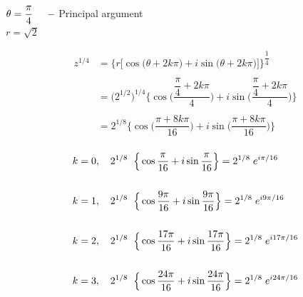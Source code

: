 \documentclass[11pt,a4paper]{article}
\begin{document}
$\theta  = \dfrac{\pi}{4} \hspace{0.5cm}- $ Principal argument\\

$r = \sqrt{2}$



\begin{align*}
z^{1/4} & = \Bigg\{r \big[ \cos \big(\theta + 2k\pi\big) + i \sin\big(\theta + 2k\pi\big)\big]\Bigg\}^{\dfrac{1}{4}}\\\\
& = \Big(2^{1/2}\Big)^{1/4}\Bigg\{ \cos \Big(\dfrac{\dfrac{\pi}{4} + 2k\pi}{4}\Big) + i \sin \Big(\dfrac{\dfrac{\pi}{4} + 2k\pi}{4}\Big)\Bigg\}\\\\ 
& = 2^{1/8}\Bigg\{ \cos \Big(\dfrac{\pi + 8k\pi}{16}\Big) + i \sin \Big(\dfrac{\pi + 8k\pi}{16}\Big)\Bigg\}\\
\end{align*}





\begin{align*}
k = 0,&  \hspace{0.4cm} 2^{1/8}\hspace{0.2cm}\Big\{\cos \dfrac{\pi}{16} + i \sin \dfrac{\pi}{16}\Big\}  = 2^{1/8}\hspace{0.1cm}e^{i\pi/ 16}\\\\
k = 1,&  \hspace{0.4cm} 2^{1/8}\hspace{0.2cm}\Big\{\cos \dfrac{9\pi}{16} + i \sin \dfrac{9\pi}{16}\Big\}  = 2^{1/8}\hspace{0.1cm}e^{i 9\pi/ 16}\\\\
k = 2,&  \hspace{0.4cm} 2^{1/8}\hspace{0.2cm}\Big\{\cos \dfrac{17\pi}{16} + i \sin \dfrac{17\pi}{16}\Big\}  = 2^{1/8}\hspace{0.1cm}e^{i 17\pi/ 16}\\\\
k = 3,&  \hspace{0.4cm} 2^{1/8}\hspace{0.2cm}\Big\{\cos \dfrac{24\pi}{16} + i \sin \dfrac{24\pi}{16}\Big\}  = 2^{1/8}\hspace{0.1cm}e^{i 24\pi/ 16}
\end{align*}
\end{document}
